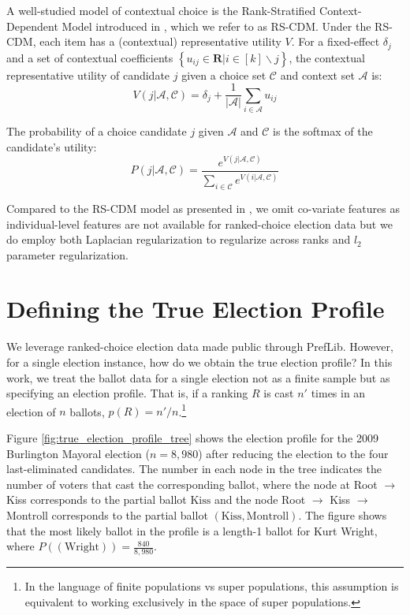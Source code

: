\documentclass{article}
\begin{document}
A well-studied model of contextual choice is the Rank-Stratified Context-Dependent Model introduced in \citet{rank2023awadelkarim}, which we refer to as RS-CDM. Under the RS-CDM, each item has a (contextual) representative utility $V$. For a fixed-effect $\delta_j$ and a set of contextual coefficients $\left\{u_{ij}\in\mathbf{R} \lvert i\in [k]\backslash j \right\}$, the contextual representative utility of candidate $j$ given a choice set $\mathcal{C}$ and context set $\mathcal{A}$ is:
\begin{equation}\label{eqn:utility}
    V\left(j \lvert \mathcal{A}, \mathcal{C}\right) = \delta_j + \frac{1}{\lvert \mathcal{A} \lvert} \sum_{i \in \mathcal{A}} u_{ij}
\end{equation}

The probability of a choice candidate $j$ given $\mathcal{A}$ and $\mathcal{C}$ is the softmax of the candidate's utility:
\begin{equation}\label{eqn:choice-prob}
    P\left(j \lvert \mathcal{A}, \mathcal{C}\right) = \frac{e^{V\left(j \lvert \mathcal{A}, \mathcal{C}\right)}}{\sum_{i \in \mathcal{C}} e^{V\left(i \lvert \mathcal{A}, \mathcal{C}\right)}}
\end{equation}

Compared to the RS-CDM model as presented in \citet{rank2023awadelkarim}, we omit co-variate features as individual-level features are not available for ranked-choice election data but we do employ both Laplacian regularization to regularize across ranks and $l_2$ parameter regularization.

\section{Defining the True Election Profile} 
We leverage ranked-choice election data made public through PrefLib. However, for a single election instance, how do we obtain the true election profile? In this work, we treat the ballot data for a single election not as a finite sample but as specifying an election profile. That is, if a ranking $R$ is cast $n'$ times in an election of $n$ ballots, $p(R) = n'/n$.\footnote{In the language of finite populations vs super populations, this assumption is equivalent to working exclusively in the space of super populations.}

Figure \ref{fig:true_election_profile_tree} shows the election profile for the 2009 Burlington Mayoral election ($n=8,980$) after reducing the election to the four last-eliminated candidates. The number in each node in the tree indicates the number of voters that cast the corresponding ballot, where the node at Root $\rightarrow$ Kiss corresponds to the partial ballot ${\text{Kiss}}$ and the node Root $\rightarrow$ Kiss $\rightarrow$ Montroll corresponds to the partial ballot $(\text{Kiss}, \text{Montroll})$. The figure shows that the most likely ballot in the profile is a length-1 ballot for Kurt Wright, where $P((\text{Wright})) = \frac{840}{8,980}$.
\end{document}
